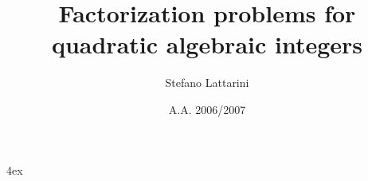 \documentclass[11pt,a4paper,leqno]{book}
\numberwithin{equation}{chapter}
\begin{document}
\baselineskip4ex

\title{Factorization problems for quadratic algebraic integers}
\author{Stefano Lattarini}
\date{A.A. 2006/2007}


\newpage
\thispagestyle{empty}
\newpage
\tableofcontents
\newpage









\end{document}
